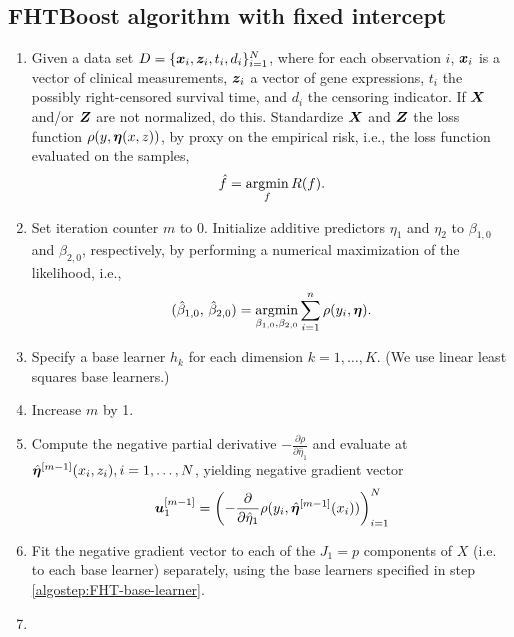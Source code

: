 \subsection{FHTBoost algorithm with fixed intercept}
\label{algo:fhtboost}
\begin{enumerate}
    \item
        Given a data set $D=\{\bm{x}_i, \bm{z}_i, t_i,d_i\}_{i=1}^N$, where for each observation $i$, $\bm{x}_i$ is a vector of clinical measurements,
        $\bm{z}_i$ a vector of gene expressions, $t_i$ the possibly right-censored survival time, and $d_i$ the censoring indicator. 
        If $\bm{X}$ and/or $\bm{Z}$ are not normalized, do this.
        Standardize $\bm{X}$ and $\bm{Z}$ the loss function $\rho(y,\boldsymbol{\eta}(x,z))$, by proxy on the empirical risk, i.e., the loss function evaluated on the samples,
        \begin{equation}
            \hat{f}=\operatorname*{argmin}_{f}R(f).
        \end{equation}
    \item
        Set iteration counter $m$ to $0$.
        Initialize additive predictors $\eta_1$ and $\eta_2$ to $\beta_{1,0}$ and $\beta_{2,0}$, respectively, by performing a numerical maximization of the likelihood, i.e.,
        \begin{equation}
            (\hat{\beta}_{1,0},\,\hat{\beta}_{2,0})=\operatorname*{argmin}_{\beta_{1,0},\beta_{2,0}}\sum_{i=1}^n\rho(y_i,\boldsymbol{\eta}).
        \end{equation}
    \item
    \label{algostep:FHT-base-learner}
        Specify a base learner $h_k$ for each dimension $k=1,\ldots,K$.
        (We use linear least squares base learners.)
    \item
    \label{algostep:FHT-init}
        Increase $m$ by 1.
    \item
        Compute the negative partial derivative $-\frac{\partial\rho}{\partial \hat{\eta}_1}$
        and evaluate at $\hat{\boldsymbol{\eta}}^{[m-1]}(x_i,z_i),i=1,\ldots,N$, yielding negative gradient vector
        \begin{equation}
            \bm{u}^{[m-1]}_1=\left(-\frac{\partial}{\partial \hat{\eta}_1}\rho(y_i, \hat{\boldsymbol{\eta}}^{[m-1]}(x_i))\right)_{i=1}^N
        \end{equation}
    \item
        Fit the negative gradient vector to each of the $J_1=p$ components of $X$ (i.e. to each base learner) separately, using the base learners specified in step \ref{algostep:FHT-base-learner}.
    \item

\end{enumerate}
